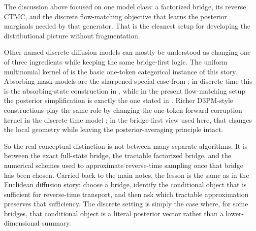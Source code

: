 \documentclass[11pt]{article}
\makeatletter
\def@path{{../../}{../}{Lecture Tex/}}
\makeatother
\begin{document}
The discussion above focused on one model class:
a factorized bridge, its reverse CTMC, and the discrete flow-matching objective that learns the posterior marginals needed by that generator.
That is the cleanest setup for developing the distributional picture without fragmentation.

Other named discrete diffusion models can mostly be understood as changing one of three ingredients while keeping the same bridge-first logic.
The uniform multinomial kernel of \citet[\S4]{hoogeboom2021argmax} is the basic one-token categorical instance of this story.
Absorbing-mask models are the sharpened special case from ; in discrete time this is the absorbing-state construction in \citet[\S3.1]{austin2021structured}, while in the present flow-matching setup the posterior simplification is exactly the one stated in \citep[Prop.~6 and App.~E.8]{gat2024discrete}.
Richer D3PM-style constructions play the same role by changing the one-token forward corruption kernel in the discrete-time model \citep[\S3.1--3.3]{austin2021structured}; in the bridge-first view used here, that changes the local geometry while leaving the posterior-averaging principle intact.

So the real conceptual distinction is not between many separate algorithms.
It is between the exact full-state bridge, the tractable factorized bridge, and the numerical schemes used to approximate reverse-time sampling once that bridge has been chosen.
Carried back to the main notes, the lesson is the same as in the Euclidean diffusion story: choose a bridge, identify the conditional object that is sufficient for reverse-time transport, and then ask which tractable approximation preserves that sufficiency.
The discrete setting is simply the case where, for some bridges, that conditional object is a literal posterior vector rather than a lower-dimensional summary.


\makeatletter
\begingroup
{}\@empty
{}
\endgroup
\makeatother

\end{document}
